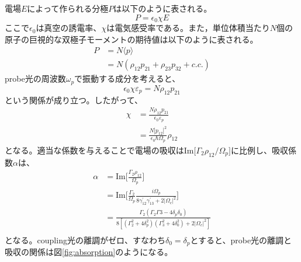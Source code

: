 \documentclass[dvipdfmx]{jsreport}
\begin{document}
電場$E$によって作られる分極$P$は以下のように表される。
\begin{equation}
    P = \epsilon_0 \chi E
\end{equation}
ここで$\epsilon_0$は真空の誘電率、$\chi$は電気感受率である。また，単位体積当たり$N$個の原子の巨視的な双極子モーメントの期待値は以下のように表される。
\begin{equation}
\begin{split}
    P &= N\langle p \rangle \\
    &= N(\rho_{12}p_{21} + \rho_{23}p_{32} + c.c.)
\end{split}
\end{equation}
probe光の周波数$\omega_p$で振動する成分を考えると、
\begin{equation}
     \epsilon_0 \chi \varepsilon_p = N\rho_{12}p_{21} 
\end{equation}
という関係が成り立つ。したがって、
\begin{equation}
\begin{split}
    \chi &=  \frac{N\rho_{12}p_{21}}{\epsilon_0 \varepsilon_p} \\
    &= \frac{N |p_{12}|^2}{\epsilon_0 \hbar \Omega_p}\rho_{12}
\end{split}
\end{equation}
となる。適当な係数を与えることで電場の吸収は$\text{Im}\lbrack \Gamma_2 \rho_{12} /\Omega_p \rbrack$に比例し、吸収係数$\alpha$は、
\begin{equation}
\begin{split}
\label{eit-absorption}
    \alpha &=  \text{Im} \lbrack \frac{\Gamma_2 \rho_{12}}{\Omega_p} \rbrack \\
    &= \text{Im} \lbrack \frac{\Gamma_2}{\Omega_p} \frac{i\Omega_p}{8\gamma_{12}^{'}\gamma_{13}^{'} + 2|\Omega_c|^2} \rbrack \\
    &= \frac{\Gamma_2 \left( \Gamma_2\Gamma3 - 4\delta_p\delta_0 \right)}{8\left[ (\Gamma_2^2 + 4\delta_p^2)(\Gamma_3^2 + 4\delta_0^2) + 2|\Omega_c|^2 \right]} \\
\end{split}
\end{equation}
となる。coupling光の離調がゼロ、すなわち$\delta_0 = \delta_p$とすると、probe光の離調と吸収の関係は図\ref{fig:absorption}のようになる。
\end{document}
